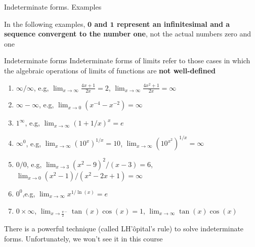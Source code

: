 \documentclass[9pt]{beamer}
\begin{document}
\begin{frame}{Indeterminate forms. Examples}

    In the following examples, {\bf $\pmb{0}$ and $\pmb{1}$ represent an infinitesimal and a sequence convergent to the number one}, not the actual numbers zero and one
    \vspace{0.3cm}
    
    \begin{block}{Indeterminate forms}
    Indeterminate forms of limits refer to those cases in which the algebraic operations of limits of functions %
    are \textbf{not well-defined}
            \begin{enumerate}[leftmargin = 0.5cm, label = $\bullet$, rightmargin = 0.2cm]
            
            \item $\infty/\infty$,\quad
            e.g, $\lim_{x \rightarrow \infty }\frac{4x + 1}{2x} = 2$, $\lim_{x\rightarrow \infty }\frac{4x^2 + 1}{2x} = \infty$
            \item $\infty - \infty$,\quad
            e.g, $\lim_{x\rightarrow 0} (x^{-4} - x^{-2}) = \infty$
            \item $1^\infty$,\quad
            e.g, $\lim_{x\rightarrow \infty} (1 + 1/x)^x = e$
            \item $\infty^0$,\quad
            e.g, $\lim_{x\rightarrow \infty} (10^x)^{1/x} = 10$, $\lim_{x\rightarrow \infty} (10^{x^2})^{1/x} = \infty$
            \item $0/0$,\quad 
            e.g, $\lim_{x\rightarrow 3}(x^2-9)^2/(x-3) = 6$, $\lim_{x\rightarrow 0} (x^2 - 1)/(x^2 - 2x + 1) = \infty$
            \item $0^0$,\quad e.g, $\lim_{x\rightarrow\infty} x^{1/\ln(x)} = e$
            
            \item $0\times\infty$,\quad
            $\lim_{x\rightarrow\frac{\pi}{2}^-} \tan(x)\cos(x) = 1$, $\lim_{x\rightarrow \infty} \tan(x)\cos(x)$ 
            
            \end{enumerate}
    \end{block}

    \begin{center}
    {\tiny
    There is a powerful technique (called LH'ôpital's rule) to solve indeterminate forms. 
    Unfortunately, we won't see it in this course
    }    
    \end{center}
    
    
\end{frame}
\end{document}
